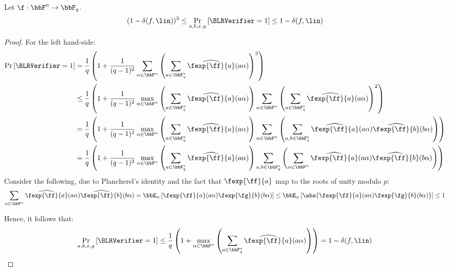 \begin{theorem}
Let $\f:\bbF^n\rightarrow\bbF_q$. 
\[
(1-\delta(f,\lin))^3 \le \Pr_{a,b,x,y}\left[\BLRVerifier=1\right] \le 1-\delta(f,\lin)
\]
\end{theorem}
\begin{proof}
For the left hand-side:
\begin{align*}
\Pr\left[\BLRVerifier=1 \right] &= \frac{1}{q}\left(1+\frac{1}{(q-1)^2}\sum_{\alpha\in\bbF^n}\left(\sum_{a\in\bbF_q^{*}}\widehat{\fexp{\ff}{a}}(a\alpha)\right)^3\right)\\
&\le  \frac{1}{q}\left(1+\frac{1}{(q-1)^2}\max_{\alpha\in\bbF^n}\left(\sum_{a\in\bbF_q^{*}}\widehat{\fexp{\ff}{a}}(a\alpha)\right)\sum_{\alpha\in\bbF^n}\left(\sum_{a\in\bbF_q^{*}}\widehat{\fexp{\ff}{a}}(a\alpha)\right)^2\right)\\
&=  \frac{1}{q}\left(1+\frac{1}{(q-1)^2}\max_{\alpha\in\bbF^n}\left(\sum_{a\in\bbF_q^{*}}\widehat{\fexp{\ff}{a}}(a\alpha)\right)\sum_{\alpha\in\bbF^n}\left(\sum_{a,b\in\bbF_q^{*}}\widehat{\fexp{\ff}{a}}(a\alpha)\widehat{\fexp{\ff}{b}}(b\alpha)\right)\right)\\
&=  \frac{1}{q}\left(1+\frac{1}{(q-1)^2}\max_{\alpha\in\bbF^n}\left(\sum_{a\in\bbF_q^{*}}\widehat{\fexp{\ff}{a}}(a\alpha)\right)\sum_{a,b\in\bbF_q^{*}}\left(\sum_{\alpha\in\bbF^n}\widehat{\fexp{\ff}{a}}(a\alpha)\widehat{\fexp{\ff}{b}}(b\alpha)\right)\right)
\end{align*}
Consider the following, due to Plancherel's identity and the fact that $\fexp{\ff}{a}$ map to the roots of unity modulo $p$:
\begin{align*}
\sum_{\alpha\in\bbF^n}\widehat{\fexp{\ff}{a}}(a\alpha)\widehat{\fexp{\ff}{b}}(b\alpha) 
= \bbE_{\alpha}\left[{\fexp{\ff}{a}(a\alpha)\fexp{\fg}{b}(b\alpha)}\right] 
\le \bbE_{\alpha}\left[{\abs{\fexp{\ff}{a}(a\alpha)\fexp{\fg}{b}(b\alpha)}}\right]\le 1
\end{align*}

Hence, it follows that:
\[
 \Pr_{a,b,x,y}\left[\BLRVerifier=1\right] \le   \frac{1}{q}\left(1+\max_{\alpha\in\bbF^n}\left(\sum_{a\in\bbF_q^{*}}\widehat{\fexp{\ff}{a}}(a\alpha)\right)\right)
= 1-\delta(f,\lin)
\]


\end{proof}
